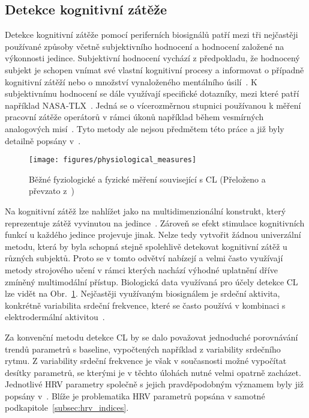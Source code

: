 \subsection{Detekce kognitivní zátěže}
\label{subsec:detekce_CL}
Detekce kognitivní zátěže pomocí periferních biosignálů patří mezi tři
nejčastěji používané způsoby včetně subjektivního hodnocení a hodnocení založené
na výkonnosti jedince. Subjektivní hodnocení vychází z předpokladu, že hodnocený
subjekt je schopen vnímat své vlastní kognitivní procesy a informovat o případně
kognitivní zátěží nebo o množství vynaloženého mentálního
úsilí~\cite{Wang2019,Schnotz2007}. K subjektivnímu hodnocení se dále využívají
specifické dotazníky, mezi které patří například NASA-TLX~\cite{Schnotz2007}.
Jedná se o vícerozměrnou stupnici používanou k měření pracovní zátěže operátorů
v rámci úkonů například během vesmírných analogových misí~\cite{Sandra2006}.
Tyto metody ale nejsou předmětem této práce a již byly detailně popsány
v~\cite{Schnotz2007}.

\begin{figure}[!htb]
    \begin{center}
        \texttt{[image: figures/physiological\_measures]}
        \caption{Běžné fyziologické a fyzické měření související s \gls{CL} (Přeloženo
            a převzato z~\cite{Giannakakis2022})}
        \label{fig:physiological_measures}
    \end{center}
\end{figure}

Na kognitivní zátěž lze nahlížet jako na multidimenzionální konstrukt, který
reprezentuje zátěž vyvinutou na jedince~\cite{Wang2019}. Zároveň se efekt
stimulace kognitivních funkcí u každého jedince projevuje jinak. Nelze tedy
vytvořit žádnou univerzální metodu, která by byla schopná stejně spolehlivě
detekovat kognitivní zátěž u různých subjektů. Proto se v tomto odvětví nabízejí
a velmi často využívají metody strojového učení v rámci kterých nachází výhodné
uplatnění dříve zmíněný multimodální přístup. Biologická data využívaná pro
účely detekce \gls{CL} lze vidět na Obr.~\ref{fig:physiological_measures}.
Nejčastěji využívaným biosignálem je srdeční aktivita, konkrétně variabilita
srdeční frekvence, které se často používá v kombinaci s
elektrodermální aktivitou~\cite{Wang2019}.

Za konvenční metodu detekce \gls{CL} by se dalo považovat jednoduché porovnávání
trendů parametrů s baseline, vypočtených například z variability srdečního
rytmu. Z variability srdeční frekvence je však v současnosti možné vypočítat
desítky parametrů, se kterými je v těchto úlohách nutné velmi opatrně zacházet.
Jednotlivé \gls{HRV} parametry společně s jejich pravděpodobným významem byly
již popsány v~\cite{Haapalainen2010,Rohila2020,Pham2021,Bouny2021}. Blíže je
problematika \gls{HRV} parametrů popsána v samotné
podkapitole~\ref{subsec:hrv_indices}.

